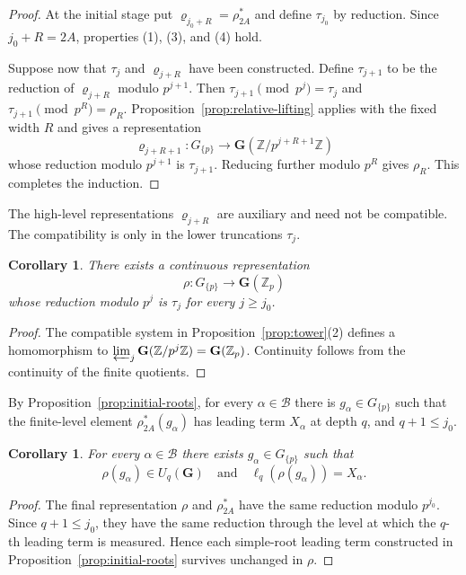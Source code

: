 \documentclass[11pt]{amsart}
\numberwithin{equation}{section}
\newcommand{\Z}{\mathbb Z}
\newcommand{\Zp}{\mathbb Z_p}
\newcommand{\GG}{\mathbf G}
\newtheorem{corollary}[theorem]{Corollary}
\theoremstyle{definition}
\begin{document}
\begin{proof}
At the initial stage put
$\varrho_{j_0+R}=\rho_{2A}^*$ and define $\tau_{j_0}$ by reduction.
Since $j_0+R=2A$, properties (1), (3), and (4) hold.

Suppose now that $\tau_j$ and $\varrho_{j+R}$ have been constructed.
Define $\tau_{j+1}$ to be the reduction of $\varrho_{j+R}$ modulo
$p^{j+1}$. Then $\tau_{j+1}\pmod{p^j}=\tau_j$ and
$\tau_{j+1}\pmod{p^R}=\rho_R$.  Proposition~\ref{prop:relative-lifting}
applies with the fixed width $R$ and gives a representation
\[
 \varrho_{j+R+1}:G_{\{p\}}
 \longrightarrow\GG(\Z/p^{j+R+1}\Z)
\]
whose reduction modulo $p^{j+1}$ is $\tau_{j+1}$.  Reducing further
modulo $p^R$ gives $\rho_R$.  This completes the induction.
\end{proof}

The high-level representations $\varrho_{j+R}$ are auxiliary and need
not be compatible.  The compatibility is only in the lower
truncations $\tau_j$.

\begin{corollary}\label{cor:limit}
There exists a continuous representation
\[
        \rho:G_{\{p\}}\longrightarrow\GG(\Zp)
\]
whose reduction modulo $p^j$ is $\tau_j$ for every $j\ge j_0$.
\end{corollary}

\begin{proof}
The compatible system in Proposition~\ref{prop:tower}(2) defines a
homomorphism to
$\varprojlim_j\GG(\Z/p^j\Z)=\GG(\Zp)$.  Continuity follows from the
continuity of the finite quotients.
\end{proof}

By Proposition~\ref{prop:initial-roots}, for every
$\alpha\in\mathcal B$ there is $g_\alpha\in G_{\{p\}}$ such that the
finite-level element $\rho_{2A}^*(g_\alpha)$ has leading term
$X_\alpha$ at depth $q$, and $q+1\le j_0$.

\begin{corollary}\label{cor:persistent-roots}
For every $\alpha\in\mathcal B$ there exists
$g_\alpha\in G_{\{p\}}$ such that
\[
        \rho(g_\alpha)\in U_q(\GG)
        \quad\text{and}\quad
        \ell_q(\rho(g_\alpha))=X_\alpha.
\]
\end{corollary}

\begin{proof}
The final representation $\rho$ and $\rho_{2A}^*$ have the same
reduction modulo $p^{j_0}$.  Since $q+1\le j_0$, they have the same
reduction through the level at which the $q$-th leading term is
measured.  Hence each simple-root leading term constructed in
Proposition~\ref{prop:initial-roots} survives unchanged in $\rho$.
\end{proof}
\end{document}
